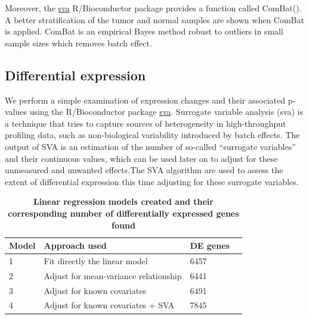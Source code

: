 \documentclass[9pt,twocolumn,twoside]{gsajnl}
\begin{document}
Moreover, the \href{http://www.bioconductor.org/packages/release/bioc/html/sva.html}{sva} R/Bioconductor package provides a function called ComBat(). A better stratification of the tumor and normal samples are shown when ComBat is applied. ComBat is an empirical Bayes method robust to outliers in small sample sizes which removes batch effect. 


\subsection*{Differential expression}

We perform a simple examination of expression changes and their associated p-values using the R/Bioconductor package \href{http://www.bioconductor.org/packages/release/bioc/html/sva.html}{sva}. Surrogate variable analysis (sva) is a technique that tries to capture sources of heterogeneity in high-throughput profiling data, such as non-biological variability introduced by batch effects. The output of SVA is an estimation of the number of so-called “surrogate variables” and their continuous values, which can be used later on to adjust for these unmeasured and unwanted effects.The SVA algorithm are used to assess the extent of differential expression this time adjusting for these surrogate variables. 

\begin{table}[htbp]
\begin{center}
\caption{\bf Linear regression models created and their corresponding number of differentially expressed genes found}
\begin{tableminipage}{\textwidth}
\begin{tabularx}{\textwidth}{XXXX}
\hline
Model & Approach used & DE genes \\ [0.5ex]
\hline
1 & Fit directly the linear model & 6457 \\
2 & Adjust for mean-variance relationship & 6441 \\
3 & Adjust for known covariates & 6491 \\
4 & Adjust for known covariates + SVA & 7845 \\
\hline
\end{tabularx}
  \label{tab:shape-functions}
\end{tableminipage}
\end{center}
\end{table}
\end{document}
